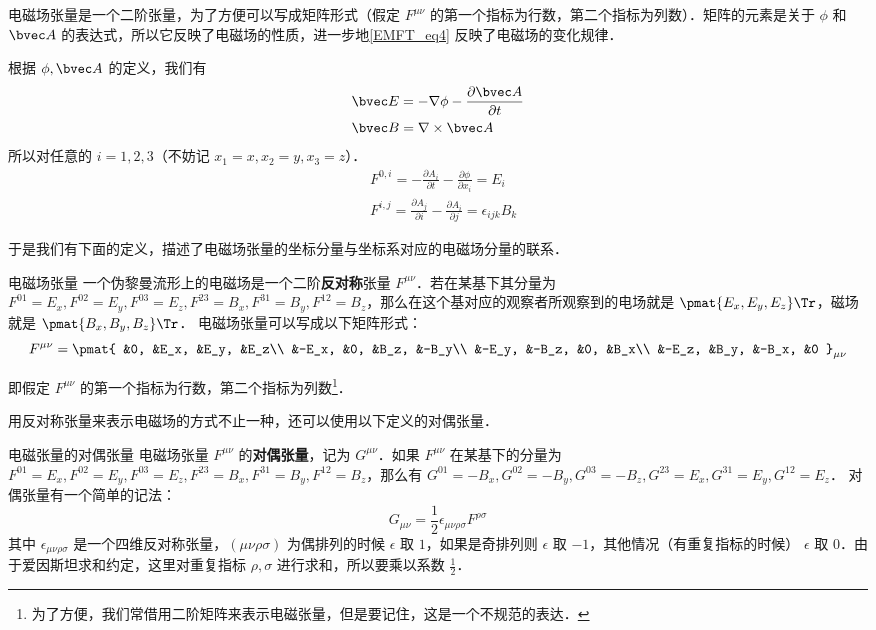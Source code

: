 电磁场张量是一个二阶张量，为了方便可以写成矩阵形式（假定 $F^{\mu\nu}$ 的第一个指标为行数，第二个指标为列数）．矩阵的元素是关于 $\phi$ 和 $\bvec A$ 的表达式，所以它反映了电磁场的性质，进一步地\autoref{EMFT_eq4} 反映了电磁场的变化规律．

根据 $\phi,\bvec A$ 的定义，我们有
\begin{equation}
\begin{aligned}
&\bvec E=-\nabla \phi-\frac{ \partial \bvec A}{\partial t}
\\
&\bvec B=\nabla\times \bvec A
\end{aligned}
\end{equation}
所以对任意的 $i=1,2,3$（不妨记 $x_1=x,x_2=y,x_3=z$）．
\begin{equation}
\begin{aligned}
&F^{0,i}=-\frac{\partial A_i}{\partial t}-\frac{\partial \phi}{\partial x_i}=E_i\\
&F^{i,j}=\frac{\partial A_j}{\partial i}-\frac{\partial A_i}{\partial j}=\epsilon_{ijk}B_k
\end{aligned}
\end{equation}

于是我们有下面的定义，描述了电磁场张量的坐标分量与坐标系对应的电磁场分量的联系．

\begin{definition}{电磁场张量}
一个伪黎曼流形上的电磁场是一个二阶\textbf{反对称}张量 $F^{\mu\nu}$．若在某基下其分量为 $F^{01}=E_x, F^{02}=E_y, F^{03}=E_z, F^{23}=B_x, F^{31}=B_y, F^{12}=B_z$，那么在这个基对应的观察者所观察到的电场就是 $\pmat{E_x, E_y, E_z}\Tr$，磁场就是 $\pmat{B_x, B_y, B_z}\Tr$．
电磁场张量可以写成以下矩阵形式：
\begin{equation}\label{EMFT_eq1}
F^{\mu\nu}=\pmat{
&0, &E_x, &E_y, &E_z\\
&-E_x, &0, &B_z, &-B_y\\
&-E_y, &-B_z, &0, &B_x\\
&-E_z, &B_y, &-B_x, &0
}_{\mu\nu}
\end{equation}
\end{definition}
即假定 $F^{\mu\nu}$ 的第一个指标为行数，第二个指标为列数\footnote{为了方便，我们常借用二阶矩阵来表示电磁张量，但是要记住，这是一个不规范的表达．}．

用反对称张量来表示电磁场的方式不止一种，还可以使用以下定义的对偶张量．

\begin{definition}{电磁张量的对偶张量}
电磁场张量 $F^{\mu\nu}$ 的\textbf{对偶张量}，记为 $G^{\mu\nu}$．如果 $F^{\mu\nu}$ 在某基下的分量为 $F^{01}=E_x, F^{02}=E_y, F^{03}=E_z, F^{23}=B_x, F^{31}=B_y, F^{12}=B_z$，那么有 $G^{01}=-B_x, G^{02}=-B_y, G^{03}=-B_z, G^{23}=E_x, G^{31}=E_y, G^{12}=E_z$．
对偶张量有一个简单的记法：
\begin{equation}
G_{\mu\nu}=\frac{1}{2}\epsilon_{\mu\nu\rho\sigma}F^{\rho\sigma}
\end{equation}
其中 $\epsilon_{\mu\nu\rho\sigma}$ 是一个四维反对称张量，$(\mu\nu\rho\sigma)$ 为偶排列的时候 $\epsilon$ 取 $1$，如果是奇排列则 $\epsilon$ 取 $-1$，其他情况（有重复指标的时候） $\epsilon$ 取 $0$．由于爱因斯坦求和约定，这里对重复指标 $\rho,\sigma$ 进行求和，所以要乘以系数 $\frac{1}{2}$．
\end{definition}

